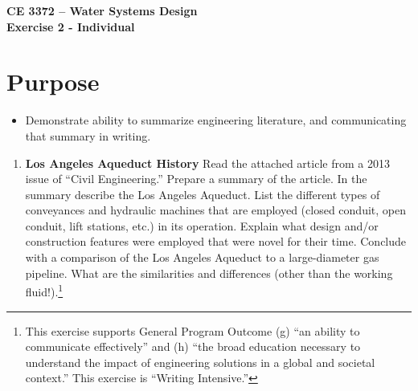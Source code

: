 \documentclass[12pt]{article}
\begin{document}
\begin{center}
{\textbf{{ CE 3372 -- Water Systems Design} \\ {Exercise 2 - Individual}}}
\end{center}
\section*{\small{Purpose}}
\begin{itemize}
\item Demonstrate ability to summarize engineering literature, and communicating that summary in writing.
\end{itemize}
\begin{enumerate}

\item{\textbf{Los Angeles Aqueduct History}}
Read the attached article from a 2013 issue of ``Civil Engineering.''   Prepare a summary of the article.   In the summary describe the Los Angeles Aqueduct.  List the different types of conveyances and hydraulic machines that are employed (closed conduit, open conduit, lift stations, etc.) in its operation.  Explain what design and/or construction features were employed that were novel for their time.  Conclude with a comparison of the Los Angeles Aqueduct to a large-diameter gas pipeline.  What are the similarities and differences (other than the working fluid!).\footnote{This exercise supports General Program Outcome (g) ``an ability to communicate effectively'' and (h) ``the broad education necessary to understand the impact of engineering solutions in a global and societal context.''   This exercise is ``Writing Intensive.''}
\end{enumerate}

\end{document}
